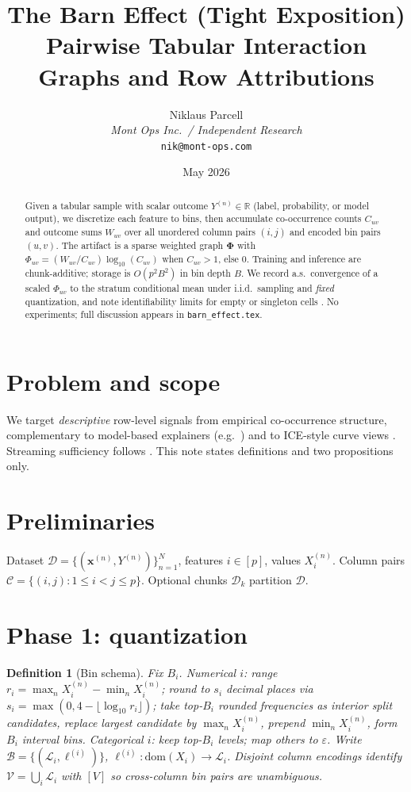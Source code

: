 \documentclass[11pt]{article}
\title{The Barn Effect (Tight Exposition)\\
\large Pairwise Tabular Interaction Graphs and Row Attributions}
\author{Niklaus Parcell\\
\textit{Mont Ops Inc.\ / Independent Research}\\
\texttt{nik@mont-ops.com}}
\date{May 2026}
\newtheorem{definition}{Definition}
\begin{document}
\maketitle

\begin{abstract}
Given a tabular sample with scalar outcome $Y^{(n)}\in\mathbb{R}$ (label, probability, or model output), we discretize each feature to bins, then accumulate co-occurrence counts $C_{uv}$ and outcome sums $W_{uv}$ over all unordered column pairs $(i,j)$ and encoded bin pairs $(u,v)$.
The artifact is a sparse weighted graph $\bm{\Phi}$ with $\Phi_{uv}=(W_{uv}/C_{uv})\log_{10}(C_{uv})$ when $C_{uv}>1$, else $0$.
Training and inference are chunk-additive; storage is $O(p^2B^2)$ in bin depth $B$.
We record a.s.\ convergence of a scaled $\Phi_{uv}$ to the stratum conditional mean under i.i.d.\ sampling and \emph{fixed} quantization, and note identifiability limits for empty or singleton cells \cite{Agresti2013,Manski2003}.
No experiments; full discussion appears in \texttt{barn\_effect.tex}.
\end{abstract}

\section{Problem and scope}
We target \emph{descriptive} row-level signals from empirical co-occurrence structure, complementary to model-based explainers (e.g.\ \cite{Lundberg2017,Ribeiro2016}) and to ICE-style curve views \cite{Goldstein2015}.
Streaming sufficiency follows \cite{Gama2014,Bifet2018}.
This note states definitions and two propositions only.

\section{Preliminaries}
Dataset $\mathcal{D}=\{(\bm{x}^{(n)},Y^{(n)})\}_{n=1}^N$, features $i\in[p]$, values $X_i^{(n)}$.
Column pairs $\mathcal{C}=\{(i,j):1\le i<j\le p\}$.
Optional chunks $\mathcal{D}_k$ partition $\mathcal{D}$.

\section{Phase 1: quantization}
\begin{definition}[Bin schema]
\label{def:bin-tight}
Fix $B_i$.
\emph{Numerical $i$:} range $r_i=\max_n X_i^{(n)}-\min_n X_i^{(n)}$; round to $s_i$ decimal places via $s_i=\max(0,4-\lfloor\log_{10} r_i\rfloor)$; take top-$B_i$ rounded frequencies as interior split candidates, replace largest candidate by $\max_n X_i^{(n)}$, prepend $\min_n X_i^{(n)}$, form $B_i$ interval bins.
\emph{Categorical $i$:} keep top-$B_i$ levels; map others to $\varepsilon$.
Write $\mathcal{B}=\{(\mathcal{L}_i,\ell^{(i)})\}$, $\ell^{(i)}:\mathrm{dom}(X_i)\to\mathcal{L}_i$.
Disjoint column encodings identify $\mathcal{V}=\bigcup_i\mathcal{L}_i$ with $[V]$ so cross-column bin pairs are unambiguous.
\end{definition}
\end{document}
